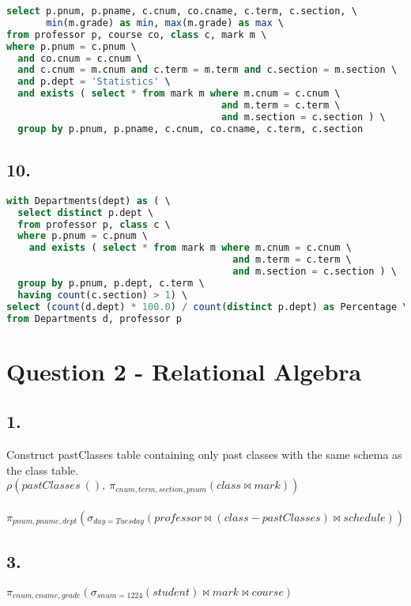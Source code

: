 \documentclass[12pt]{article}
\begin{document}
\begin{lstlisting}[language=sql]
select p.pnum, p.pname, c.cnum, co.cname, c.term, c.section, \
       min(m.grade) as min, max(m.grade) as max \
from professor p, course co, class c, mark m \
where p.pnum = c.pnum \
  and co.cnum = c.cnum \
  and c.cnum = m.cnum and c.term = m.term and c.section = m.section \
  and p.dept = 'Statistics' \
  and exists ( select * from mark m where m.cnum = c.cnum \
                                      and m.term = c.term \
                                      and m.section = c.section ) \
  group by p.pnum, p.pname, c.cnum, co.cname, c.term, c.section
\end{lstlisting}
\vspace{1em}
\subsection*{10.}

\begin{lstlisting}[language=sql]
with Departments(dept) as ( \
  select distinct p.dept \
  from professor p, class c \
  where p.pnum = c.pnum \
    and exists ( select * from mark m where m.cnum = c.cnum \
                                        and m.term = c.term \
                                        and m.section = c.section ) \
  group by p.pnum, p.dept, c.term \
  having count(c.section) > 1) \
select (count(d.dept) * 100.0) / count(distinct p.dept) as Percentage \
from Departments d, professor p
\end{lstlisting}

\pagebreak
\section*{Question 2 - Relational Algebra}

\subsection*{1.}
Construct pastClasses table containing only past classes with the same schema as the class table.\\
$\rho(pastClasses\ (),\ \pi_{cnum, term, section, pnum}(class \bowtie mark))$ \\
\\
$\pi_{pnum, pname, dept}(\sigma_{day=Tuesday}( professor \bowtie (class - pastClasses) \bowtie schedule))$

\subsection*{3.}
$\pi_{cnum, cname, grade}(\sigma_{snum=1224}(student) \bowtie mark \bowtie course)$
\end{document}
